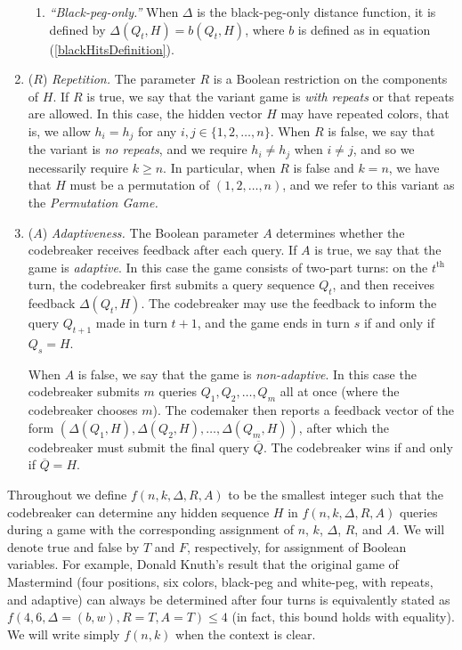 \documentclass[12pt, a4paper]{article}
\newcommand{\nth}{^{\text{th}}}       %
\begin{document}
\begin{enumerate}[label=(\roman*)]
\begin{enumerate}[label=\alph*.]
		\item\textit{``Black-peg-only.''} When $\Delta$ is the black-peg-only distance function, it is defined by $\Delta(Q_t, H) = b(Q_t, H)$, where $b$ is defined as in equation (\ref{blackHitsDefinition}).
	\end{enumerate}
	
	\item($R$) \textit{Repetition.} The parameter $R$ is a Boolean restriction on the components of $H$. If $R$ is true, we say that the variant game is \textit{with repeats} or that repeats are allowed. In this case, the hidden vector $H$ may have repeated colors, that is, we allow $h_i = h_j$ for any $i,j\in\{1,2,\ldots, n\}$. When $R$ is false, we say that the variant is \textit{no repeats}, and we require $h_i\neq h_j$ when $i\neq j$, and so we necessarily require $k \geq n$. In particular, when $R$ is false and $k = n$, we have that $H$ must be a permutation of $(1, 2, \ldots, n)$, and we refer to this variant as the \textit{Permutation Game.}
	
	\item($A$) \textit{Adaptiveness.} The Boolean parameter $A$ determines whether the codebreaker receives feedback after each query. If $A$ is true, we say that the game is \textit{adaptive}. In this case the game consists of two-part turns: on the $t\nth$ turn, the codebreaker first submits a query sequence $Q_t$, and then receives feedback $\Delta(Q_t, H)$. The codebreaker may use the feedback to inform the query $Q_{t+1}$ made in turn $t+1$, and the game ends in turn $s$ if and only if $Q_s = H$.
	
	When $A$ is false, we say that the game is \textit{non-adaptive}. In this case the codebreaker submits $m$ queries $Q_1, Q_2, \ldots, Q_m$ all at once (where the codebreaker chooses $m$). The codemaker then reports a feedback vector of the form $(\Delta(Q_1, H), \Delta(Q_2, H), \ldots, \Delta(Q_m, H))$, after which the codebreaker must submit the final query $\overline{Q}$. The codebreaker wins if and only if $\overline{Q} = H$.
\end{enumerate}

Throughout we define $f(n, k, \Delta, R, A)$ to be the smallest integer such that the codebreaker can determine any hidden sequence $H$ in $f(n, k, \Delta, R, A)$ queries during a game with the corresponding assignment of $n$, $k$, $\Delta$, $R$, and $A$. We will denote true and false by $T$ and $F$, respectively, for assignment of Boolean variables. For example, Donald Knuth's result that the original game of Mastermind (four positions, six colors, black-peg and white-peg, with repeats, and adaptive) can always be determined after four turns is equivalently stated as $f(4, 6, \Delta = (b,w), R=T, A=T)\le 4$ (in fact, this bound holds with equality). We will write simply $f(n, k)$ when the context is clear.
\end{document}

